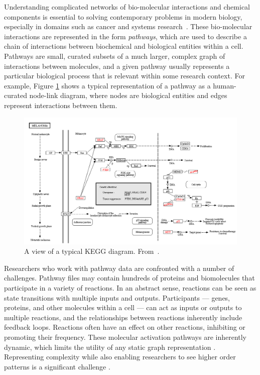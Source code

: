 \documentclass{egpubl}
\begin{document}
Understanding complicated networks of bio-molecular interactions and chemical components is essential to solving contemporary problems in modern biology, especially in domains such as cancer and systems research~\cite{hanahan2011hallmarks}.
These bio-molecular interactions are represented in the form \emph{pathways}, which are used to describe a chain of interactions between biochemical and biological entities within a cell.
Pathways are small, curated subsets of a much larger, complex graph of interactions between molecules, and a given pathway usually represents a particular biological process that is relevant within some research context.
For example, Figure \ref{fig:kvik} shows a typical representation of a pathway as a human-curated node-link diagram, where nodes are biological entities and edges represent interactions between them.

\begin{figure}[htb]
  \centering
  \includegraphics[width=\linewidth]{figures/kegg2}
  \caption{\label{fig:kvik} A view of a typical KEGG diagram. From~\cite{Fjukstad2014kvik}.}
\end{figure}


Researchers who work with pathway data are confronted with a number of challenges.
Pathway files may contain hundreds of proteins and biomolecules that participate in a variety of reactions.
In an abstract sense, reactions can be seen as state transitions with multiple inputs and outputs.
Participants --- genes, proteins, and other molecules within a cell --- can act as inputs or outputs to multiple reactions, and the relationships between reactions inherently include feedback loops.
Reactions often have an effect on other reactions, inhibiting or promoting their frequency.
These molecular activation pathways are inherently dynamic, which limits the utility of any static graph representation \cite{kitano2002systems}.
Representing complexity while also enabling researchers to see higher order patterns is a significant challenge \cite{saraiya2005visualizing}.
\end{document}
